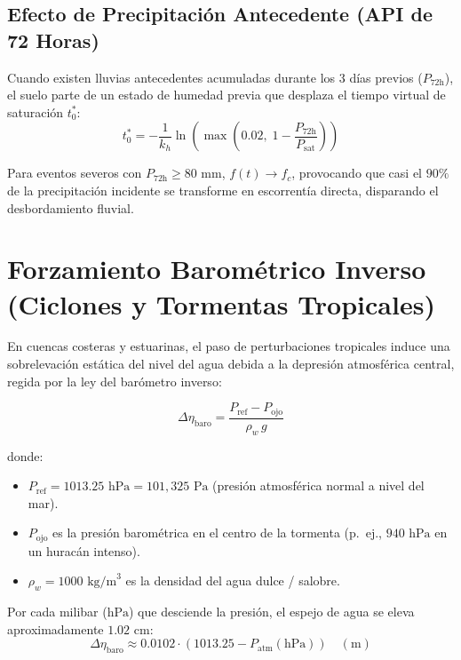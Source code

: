 \documentclass[11pt,a4paper]{article}
\begin{document}
\subsection{Efecto de Precipitación Antecedente (API de 72 Horas)}

Cuando existen lluvias antecedentes acumuladas durante los 3 días previos ($P_{72\text{h}}$), el suelo parte de un estado de humedad previa que desplaza el tiempo virtual de saturación $t_0^*$:
\begin{equation}
  t_0^* = -\frac{1}{k_h} \ln\left( \max\left(0.02, \; 1 - \frac{P_{72\text{h}}}{P_{\text{sat}}} \right) \right)
\end{equation}

Para eventos severos con $P_{72\text{h}} \ge 80\text{ mm}$, $f(t) \to f_c$, provocando que casi el $90\%$ de la precipitación incidente se transforme en escorrentía directa, disparando el desbordamiento fluvial.

\section{Forzamiento Barométrico Inverso (Ciclones y Tormentas Tropicales)}

En cuencas costeras y estuarinas, el paso de perturbaciones tropicales induce una sobrelevación estática del nivel del agua debida a la depresión atmosférica central, regida por la ley del barómetro inverso:

\begin{equation}
  \Delta \eta_{\text{baro}} = \frac{P_{\text{ref}} - P_{\text{ojo}}}{\rho_w \, g}
\end{equation}

donde:
\begin{itemize}
  \item $P_{\text{ref}} = 1013.25\text{ hPa} = 101{,}325\text{ Pa}$ (presión atmosférica normal a nivel del mar).
  \item $P_{\text{ojo}}$ es la presión barométrica en el centro de la tormenta (p.~ej., $940\text{ hPa}$ en un huracán intenso).
  \item $\rho_w = 1000\text{ kg/m}^3$ es la densidad del agua dulce / salobre.
\end{itemize}

Por cada milibar ($\text{hPa}$) que desciende la presión, el espejo de agua se eleva aproximadamente $1.02\text{ cm}$:
\begin{equation}
  \Delta \eta_{\text{baro}} \approx 0.0102 \cdot \left(1013.25 - P_{\text{atm}}(\text{hPa})\right) \quad (\text{m})
\end{equation}
\end{document}
